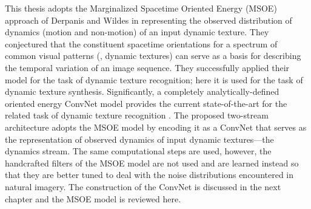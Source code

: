 This thesis adopts the Marginalized Spacetime Oriented Energy (MSOE) approach of Derpanis and Wildes \cite{derpanis2012spacetime} in representing the observed distribution of dynamics (\ie motion and non-motion) of an input dynamic texture. They conjectured that the constituent spacetime orientations for a spectrum of common
visual patterns (\eg, dynamic textures) can serve as a basis for describing the temporal
variation of an image sequence. They successfully applied their model for the task of dynamic texture recognition; here it is used for the task of dynamic texture synthesis. Significantly, a completely analytically-defined
oriented energy ConvNet model provides the current state-of-the-art
for the related task of dynamic texture recognition \cite{hadji2017}. The proposed two-stream architecture adopts the MSOE model by encoding it as a ConvNet that serves as the representation of observed dynamics of input dynamic textures---the dynamics stream. The same computational steps are used, however, the handcrafted filters of the MSOE model are not used and are learned instead so that they are better tuned to deal with the noise distributions encountered in natural imagery. The construction of the ConvNet is discussed in the next chapter and the MSOE model is reviewed here.

\clearpage

\clearpage

